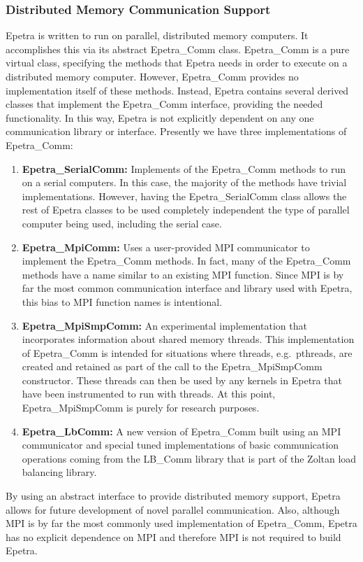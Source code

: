 \documentclass[12pt,relax]{EpetraUserGuide}
\newcommand{\comm}{Epetra\_Comm}
\newcommand{\serialcomm}{Epetra\_SerialComm}
\newcommand{\mpicomm}{Epetra\_MpiComm}
\newcommand{\mpismpcomm}{Epetra\_MpiSmpComm}
\newcommand{\lbcomm}{Epetra\_LbComm}
\begin{document}
\subsubsection{Distributed Memory Communication Support}
Epetra is written to run on parallel, distributed memory computers.  It accomplishes 
this via its abstract \comm{} class.  \comm{} is a pure virtual class,
specifying the methods that Epetra needs in order to execute on a
distributed memory computer.  However, \comm{} provides no
implementation itself of these methods.  Instead, Epetra contains
several derived classes that implement the \comm{} interface,
providing the needed functionality.  In this way, Epetra is not
explicitly dependent on any one communication library or interface.
Presently we have three implementations of \comm{}:
\begin{enumerate}
\item {\bf \serialcomm{}: } Implements of the \comm{}
methods to run on a serial computers.  In this case, the majority of
the methods have trivial implementations.  However, having the
\serialcomm{} class allows the rest of Epetra classes to be used
completely independent the type of parallel computer being used,
including the serial case.
\item {\bf \mpicomm{}: } Uses a user-provided MPI
communicator to implement the \comm{} methods.  In fact, many of the
\comm{} methods have a name similar to an existing MPI function.
Since MPI is by far the most common communication interface and
library used with Epetra, this bias to MPI function names is
intentional.
\item {\bf \mpismpcomm{}:} An experimental implementation that
incorporates information about shared memory threads.  This
implementation of \comm{} is intended for situations where threads,
e.g.~pthreads, are created and retained as part of the call to the 
\mpismpcomm{} constructor.  These threads can then be used by any
kernels in Epetra that have been instrumented to run with threads.  At
this point, \mpismpcomm{} is purely for research purposes.
\item {\bf \lbcomm{}: } A new version of \comm{} built using an MPI
communicator and special tuned implementations of basic communication
operations coming from the LB_Comm library that is part of the Zoltan
load balancing library.
\end{enumerate}

By using an abstract interface to provide distributed memory support,
Epetra allows for future development of novel parallel communication.
Also, although MPI is by far the most commonly used implementation of
\comm{}, Epetra has no explicit dependence on MPI and therefore MPI is
not required to build Epetra.
\end{document}
